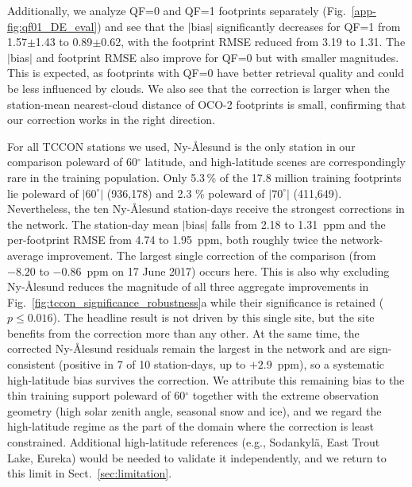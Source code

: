 Additionally, we analyze QF=0 and QF=1 footprints separately (Fig.~\ref{app-fig:qf01_DE_eval}) and see that the $|$bias$|$ significantly decreases for QF=1 from 1.57$\pm$1.43 to 0.89$\pm$0.62, with the footprint RMSE reduced from 3.19 to 1.31. The $|$bias$|$ and footprint RMSE also improve for QF=0 but with smaller magnitudes. This is expected, as footprints with QF=0 have better retrieval quality and could be less influenced by clouds. We also see that the correction is larger when the station-mean nearest-cloud distance of OCO-2 footprints is small, confirming that our correction works in the right direction.

For all TCCON stations we used, Ny-Ålesund is the only station in our comparison poleward of 60$^\circ$ latitude, and high-latitude scenes are correspondingly rare in the training population. Only 5.3\,\% of the 17.8 million training
footprints lie poleward of $|60^\circ|$ (936,178) and 2.3 \% poleward of $|70^\circ|$ (411,649). Nevertheless, the ten Ny-Ålesund station-days receive the strongest corrections in the network. The station-day mean $|$bias$|$ falls from 2.18 to 1.31~ppm and the per-footprint RMSE from 4.74 to 1.95~ppm, both roughly twice the network-average improvement. The largest single correction of the comparison (from $-8.20$ to $-0.86$~ppm on 17 June 2017) occurs here. This is also why excluding
Ny-Ålesund reduces the magnitude of all three aggregate improvements in Fig.~\ref{fig:tccon_significance_robustness}a while their significance is retained ($p \le 0.016$). The headline result is not driven by this single site, but the site benefits from the correction more than any
other. At the same time, the corrected Ny-Ålesund residuals remain the largest in the network and are sign-consistent (positive in 7 of 10 station-days, up to $+2.9$~ppm), so a systematic high-latitude bias
survives the correction. We attribute this remaining bias to the thin training support poleward of 60$^\circ$ together with the extreme observation geometry (high solar zenith angle, seasonal snow and ice), and we regard the high-latitude regime as the part of the domain where the correction is least constrained. Additional high-latitude references (e.g., Sodankylä, East Trout Lake, Eureka) would be needed to validate it independently, and we return to this limit in Sect.~\ref{sec:limitation}.


